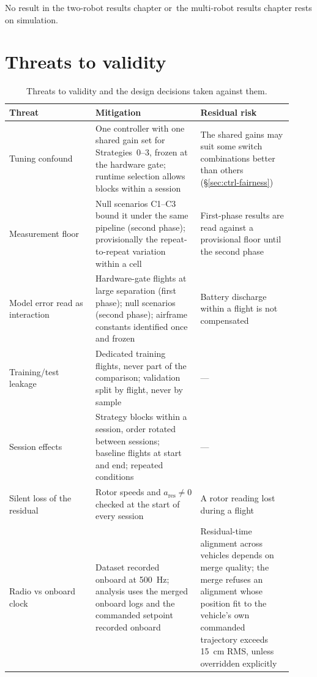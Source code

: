 No result in the two-robot results chapter or~the multi-robot results chapter rests on simulation.

\section{Threats to validity}
\label{sec:setup-validity}

\begin{table}[t]
  \centering
  \caption{Threats to validity and the design decisions taken against them.}
  \label{tab:setup-threats}
  \small
  \begin{tabular}{@{}p{0.28\linewidth}p{0.34\linewidth}p{0.30\linewidth}@{}}
    \toprule
    Threat & Mitigation & Residual risk \\
    \midrule
    Tuning confound & One controller with one shared gain set for Strategies~0--3, frozen at the hardware gate; runtime selection allows blocks within a session & The shared gains may suit some switch combinations better than others (§\ref{sec:ctrl-fairness}) \\
    Measurement floor & Null scenarios C1--C3 bound it under the same pipeline (second phase); provisionally the repeat-to-repeat variation within a cell & First-phase results are read against a provisional floor until the second phase \\
    Model error read as interaction & Hardware-gate flights at large separation (first phase); null scenarios (second phase); airframe constants identified once and frozen & Battery discharge within a flight is not compensated \\
    Training/test leakage & Dedicated training flights, never part of the comparison; validation split by flight, never by sample & --- \\
    Session effects & Strategy blocks within a session, order rotated between sessions; baseline flights at start and end; repeated conditions & --- \\
    Silent loss of the residual & Rotor speeds and $a_{\mathrm{res}} \neq 0$ checked at the start of every session & A rotor reading lost during a flight \\
    Radio vs onboard clock & Dataset recorded onboard at \SI{500}{\hertz}; analysis uses the merged onboard logs and the commanded setpoint recorded onboard & Residual-time alignment across vehicles depends on merge quality; the merge refuses an alignment whose position fit to the vehicle's own commanded trajectory exceeds \SI{15}{\centi\metre} RMS, unless overridden explicitly \\

\end{tabular}
\end{table}
